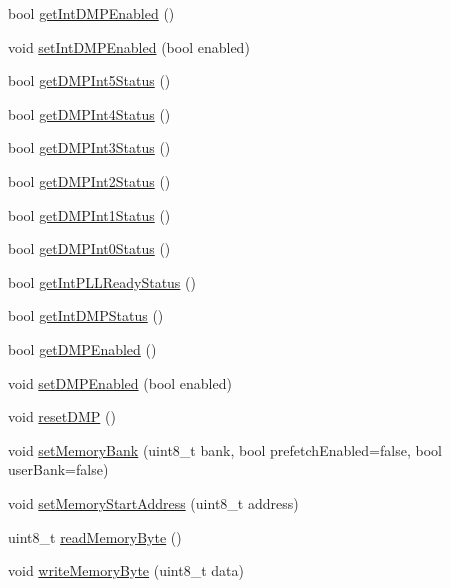 \begin{DoxyCompactItemize}
\item 
bool \mbox{\hyperlink{classMPU6050_a3af3f3c0a16b5b68cf6301cb0ac3f392}{get\+Int\+D\+M\+P\+Enabled}} ()
\item 
void \mbox{\hyperlink{classMPU6050_a889d29900cb0dd16e0199c13822f0f88}{set\+Int\+D\+M\+P\+Enabled}} (bool enabled)
\item 
bool \mbox{\hyperlink{classMPU6050_a3a86756b7fe164e454f4801c30cdbffe}{get\+D\+M\+P\+Int5\+Status}} ()
\item 
bool \mbox{\hyperlink{classMPU6050_a9d406fd5027e7a6b0e33f5bfafc67627}{get\+D\+M\+P\+Int4\+Status}} ()
\item 
bool \mbox{\hyperlink{classMPU6050_a1ac1a70c4d207c93359b43e743d34839}{get\+D\+M\+P\+Int3\+Status}} ()
\item 
bool \mbox{\hyperlink{classMPU6050_acaf41d1789aa02814af0319f71c57a9f}{get\+D\+M\+P\+Int2\+Status}} ()
\item 
bool \mbox{\hyperlink{classMPU6050_a82a5a98ad80c69209ef0f423287b2f76}{get\+D\+M\+P\+Int1\+Status}} ()
\item 
bool \mbox{\hyperlink{classMPU6050_a2b597f3f6b4188cbdb3feb2cd8dd3469}{get\+D\+M\+P\+Int0\+Status}} ()
\item 
bool \mbox{\hyperlink{classMPU6050_a559de8cd420d329c93f215938e8483e2}{get\+Int\+P\+L\+L\+Ready\+Status}} ()
\item 
bool \mbox{\hyperlink{classMPU6050_a715e66c52a2272b54782058772b50d61}{get\+Int\+D\+M\+P\+Status}} ()
\item 
bool \mbox{\hyperlink{classMPU6050_a2a17e3062b1f321d260fd70f308c6a06}{get\+D\+M\+P\+Enabled}} ()
\item 
void \mbox{\hyperlink{classMPU6050_abb6bf6db86b84700c7f13bd838d63755}{set\+D\+M\+P\+Enabled}} (bool enabled)
\item 
void \mbox{\hyperlink{classMPU6050_a7a9706f177e84b295739198e6b2ded95}{reset\+D\+MP}} ()
\item 
void \mbox{\hyperlink{classMPU6050_aa0c1753f6d2dacb1942fbef156a075bc}{set\+Memory\+Bank}} (uint8\+\_\+t bank, bool prefetch\+Enabled=false, bool user\+Bank=false)
\item 
void \mbox{\hyperlink{classMPU6050_a45013abb39103e858d432cc720bc351a}{set\+Memory\+Start\+Address}} (uint8\+\_\+t address)
\item 
uint8\+\_\+t \mbox{\hyperlink{classMPU6050_a4fb50ebcff2f4e686e3fbbafb70a1f75}{read\+Memory\+Byte}} ()
\item 
void \mbox{\hyperlink{classMPU6050_a20de45af9109402f0cfe785f8fdbf439}{write\+Memory\+Byte}} (uint8\+\_\+t data)

\end{DoxyCompactItemize}
